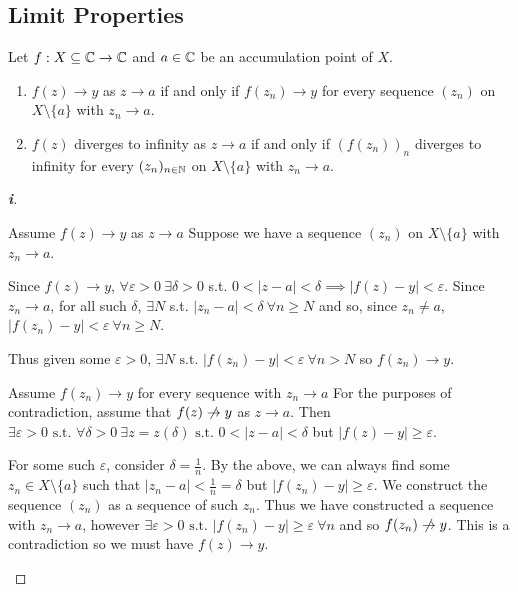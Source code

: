 \documentclass[../main.tex]{subfiles}
\begin{document}
\subsection{Limit Properties}
\begin{lemma}
  Let $f: X \subseteq \mathbb{C} \to \mathbb{C}$ and $a \in \mathbb{C}$ be an accumulation point of $X$.
  \begin{enumerate}
    \item $f(z) \to y$ as $z \to a$ if and only if $f(z_n) \to y$ for every sequence $(z_n)$ on $X \setminus \{a\}$ with $z_n \to a$.
    \item $f(z)$ diverges to infinity as $z \to a$ if and only if $(f(z_n))_n$ diverges to infinity for every $(z_n)_{n \in \mathbb{N}}$ on $X \setminus \{a\}$ with $z_n \to a$.
  \end{enumerate}
\end{lemma}
\begin{proof}[\textbf{i}]
  \begin{proofdirection}{Assume $f(z) \to y$ as $z \to a$}
    Suppose we have a sequence $(z_n)$ on $X \setminus \{a\}$ with $z_n \to a$.

    Since $f(z) \to y$, $\forall \varepsilon > 0\ \exists \delta > 0$ s.t. $0 < |z - a| < \delta \implies |f(z) - y| < \varepsilon$.
    Since $z_n \to a$, for all such $\delta$, $\exists N$ s.t. $|z_n - a| < \delta\ \forall n \geq N$ and so, since $z_n \neq a$, $|f(z_n) - y| < \varepsilon\ \forall n \geq N$.

    Thus given some $\varepsilon > 0$, $\exists N \text{ s.t. } |f(z_n) - y| < \varepsilon\ \forall n > N$ so $f(z_n) \to y$.
  \end{proofdirection}
  \begin{proofdirection}{Assume $f(z_n) \to y$ for every sequence with $z_n \to a$}
    For the purposes of contradiction, assume that $f(z) \centernot\to y$ as $z \to a$.
    Then $\exists \varepsilon > 0 \text{ s.t. } \forall \delta > 0\ \exists z = z(\delta) \text{ s.t. } 0 < |z - a| < \delta$ but $|f(z) - y| \geq \varepsilon$.

    For some such $\varepsilon$, consider $\delta = \frac{1}{n}$.
    By the above, we can always find some $z_n \in X \setminus \{a\}$ such that $|z_n - a| < \frac{1}{n} = \delta$ but $|f(z_n) - y| \geq \varepsilon$.
    We construct the sequence $(z_n)$ as a sequence of such $z_n$.
    Thus we have constructed a sequence with $z_n \to a$, however $\exists \varepsilon > 0 \text{ s.t. } |f(z_n) - y| \geq \varepsilon\ \forall n$ and so $f(z_n) \centernot\to y$.
    This is a contradiction so we must have $f(z) \to y$.
  \end{proofdirection}
\end{proof}
\end{document}
